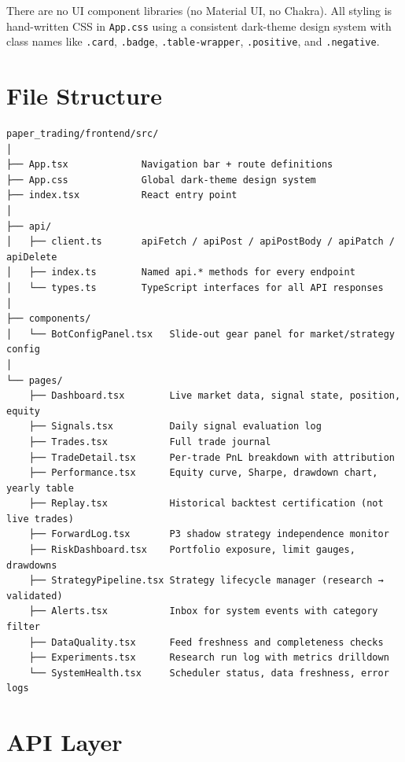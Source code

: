 \documentclass[12pt, a4paper]{article}
\begin{document}
There are no UI component libraries (no Material UI, no Chakra). All styling is
hand-written CSS in \texttt{App.css} using a consistent dark-theme design system
with class names like \texttt{.card}, \texttt{.badge}, \texttt{.table-wrapper},
\texttt{.positive}, and \texttt{.negative}.


\section{File Structure}

\begin{Verbatim}[fontsize=\small]
paper_trading/frontend/src/
│
├── App.tsx             Navigation bar + route definitions
├── App.css             Global dark-theme design system
├── index.tsx           React entry point
│
├── api/
│   ├── client.ts       apiFetch / apiPost / apiPostBody / apiPatch / apiDelete
│   ├── index.ts        Named api.* methods for every endpoint
│   └── types.ts        TypeScript interfaces for all API responses
│
├── components/
│   └── BotConfigPanel.tsx   Slide-out gear panel for market/strategy config
│
└── pages/
    ├── Dashboard.tsx        Live market data, signal state, position, equity
    ├── Signals.tsx          Daily signal evaluation log
    ├── Trades.tsx           Full trade journal
    ├── TradeDetail.tsx      Per-trade PnL breakdown with attribution
    ├── Performance.tsx      Equity curve, Sharpe, drawdown chart, yearly table
    ├── Replay.tsx           Historical backtest certification (not live trades)
    ├── ForwardLog.tsx       P3 shadow strategy independence monitor
    ├── RiskDashboard.tsx    Portfolio exposure, limit gauges, drawdowns
    ├── StrategyPipeline.tsx Strategy lifecycle manager (research → validated)
    ├── Alerts.tsx           Inbox for system events with category filter
    ├── DataQuality.tsx      Feed freshness and completeness checks
    ├── Experiments.tsx      Research run log with metrics drilldown
    └── SystemHealth.tsx     Scheduler status, data freshness, error logs
\end{Verbatim}


\section{API Layer}
\end{document}
